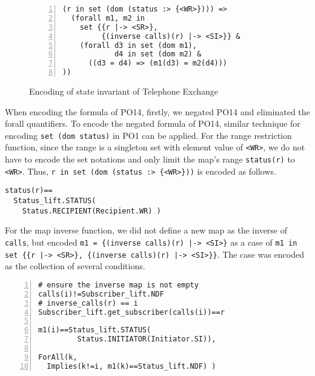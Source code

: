 \begin{figure}[t]
\begin{center}
\begin{mdframed}[roundcorner=5pt]
\begin{Verbatim}[fontsize=\small,numbers=left]
(r in set (dom (status :> {<WR>}))) =>
  (forall m1, m2 in 
    set {{r |-> <SR>}, 
         {(inverse calls)(r) |-> <SI>}} &
    (forall d3 in set (dom m1),
            d4 in set (dom m2) &
      ((d3 = d4) => (m1(d3) = m2(d4)))
))
\end{Verbatim}
\end{mdframed}
\vspace{-10pt}
\caption{Encoding of state invariant of Telephone Exchange}
\label{fig:PO14_case2}
\end{center}
\vspace{-25pt}
\end{figure}

When encoding the formula of PO14, firstly, we negated PO14 and eliminated the forall quantifiers. To encode the negated formula of PO14, similar technique for  encoding {\tt set (dom status)} in PO1 can be applied. For the range restriction function, since the range is a singleton set with element value of {\tt <WR>}, we do not have to encode the set notations and only limit the map's range {\tt status(r)} to {\tt <WR>}. Thus, {\tt r in set (dom (status :> \{<WR>\}))} is encoded as follows.

\begin{mdframed}[roundcorner=5pt,shadow=true]
\begin{Verbatim}[fontsize=\small]
status(r)==
  Status_lift.STATUS(
    Status.RECIPIENT(Recipient.WR) )
\end{Verbatim}
\end{mdframed}

For the map inverse function, we did not define a new map as the inverse of {\tt calls}, but encoded {\tt m1 = \{(inverse calls)(r) |-> <SI>\}} as a case of {\tt m1 in set \{\{r |-> <SR>\}, \{(inverse calls)(r) |-> <SI>\}\}}. The case was encoded as the collection of several conditions. 

\begin{mdframed}[roundcorner=5pt,shadow=true]
\begin{Verbatim}[fontsize=\small,numbers=left]
# ensure the inverse map is not empty
calls(i)!=Subscriber_lift.NDF 
# inverse_calls(r) == i
Subscriber_lift.get_subscriber(calls(i))==r

m1(i)==Status_lift.STATUS(
         Status.INITIATOR(Initiator.SI)),

ForAll(k, 
  Implies(k!=i, m1(k)==Status_lift.NDF) )
\end{Verbatim}
\end{mdframed}

